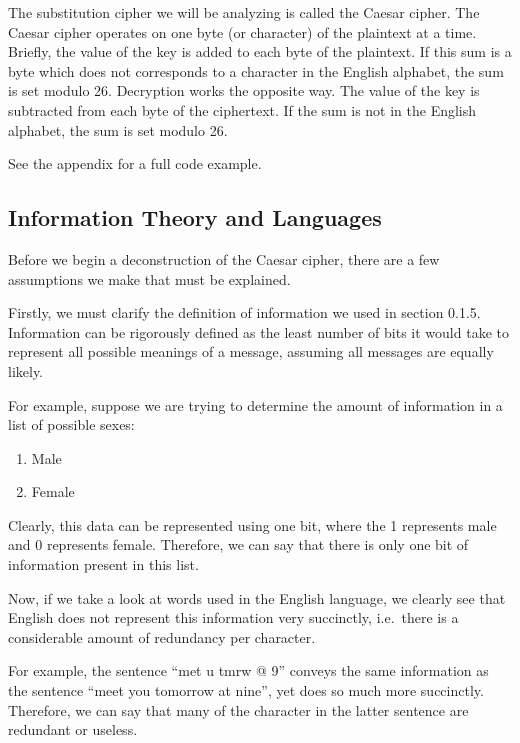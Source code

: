 \documentclass[12pt, a4paper, final]{report}
\begin{document}
The substitution cipher we will be analyzing is called the Caesar cipher.
The Caesar cipher operates on one byte (or character) of the plaintext at
a time. Briefly, the value of the key is added to each byte of the
plaintext. If this sum is a byte which does not corresponds to a
character in the English alphabet, the sum is set modulo 26.
Decryption works the opposite way. The value of the key is subtracted from
each byte of the ciphertext. If the sum is not in the English alphabet,
the sum is set modulo 26.

See the appendix for a full code example.

\subsection{Information Theory and Languages}

Before we begin a deconstruction of the Caesar cipher, there are a few
assumptions we make that must be explained.

Firstly, we must clarify the definition of information we used in section
0.1.5. Information can be rigorously defined as the least number of bits
it would take to represent all possible meanings of a message, assuming
all messages are equally likely.

For example, suppose we are trying to determine the amount of information
in a list of possible sexes:

\begin{enumerate}
\item Male
\item Female
\end{enumerate}

Clearly, this data can be represented using one bit, where the 1
represents male and 0 represents female. Therefore, we can say that there
is only one bit of information present in this list.

Now, if we take a look at words used in the English language, we clearly
see that English does not represent this information very succinctly, i.e.\
there is a considerable amount of redundancy per character.

For example, the sentence ``met u tmrw @ 9'' conveys the same information
as the sentence ``meet you tomorrow at nine'', yet does so much more
succinctly. Therefore, we can say that many of the character in the
latter sentence are redundant or useless.
\end{document}
